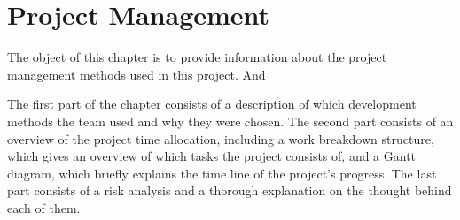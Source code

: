 \chapter{Project Management}
The object of this chapter is to provide information about the project management methods used in this project. And  

The first part of the chapter consists of a description of which development methods the team used and why they were chosen. The second part consists of an overview of the project time allocation, including a work breakdown structure, which gives an overview of which tasks the project consists of, and a Gantt diagram, which briefly explains the time line of the project's progress. The last part consists of a risk analysis and a thorough explanation on the thought behind each of them.



\newpage




